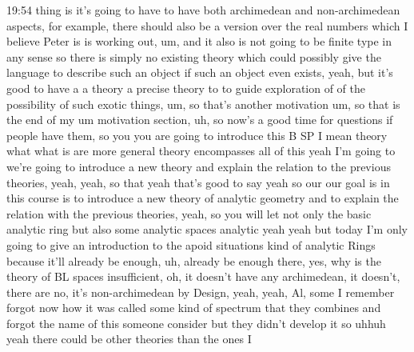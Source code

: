 \begin{unfinished}{19:54}
thing is it's going to have to have both archimedean and non-archimedean aspects, for example, there should also be a version over the real numbers which I believe Peter is is working out, um, and it also is not going to be finite type in any sense so there is simply no existing theory which could possibly give the language to describe such an object if such an object even exists, yeah, but it's good to have a a theory a precise theory to to guide exploration of of the possibility of such exotic things, um, so that's another motivation um, so that is the end of my um motivation section, uh, so now's a good time for questions if people have them, so you you are going to introduce this B SP I mean theory what what is are more general theory encompasses all of this yeah I'm going to we're going to introduce a new theory and explain the relation to the previous theories, yeah, yeah, so that yeah that's good to say yeah so our our goal is in this course is to introduce a new theory of analytic geometry and to explain the relation with the previous theories, yeah, so you will let not only the basic analytic ring but also some analytic spaces analytic yeah yeah but today I'm only going to give an introduction to the apoid situations kind of analytic Rings because it'll already be enough, uh, already be enough there, yes, why is the theory of BL spaces insufficient, oh, it doesn't have any archimedean, it doesn't, there are no, it's non-archimedean by Design, yeah, yeah, Al, some I remember forgot now how it was called some kind of spectrum that they combines and forgot the name of this someone consider but they didn't develop it so uhhuh yeah there could be other theories than the ones I


\end{unfinished}
